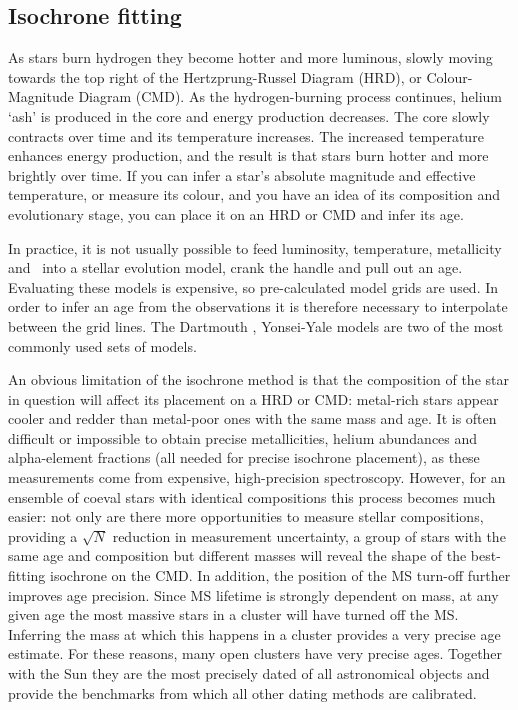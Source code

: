\subsection{Isochrone fitting}

As stars burn hydrogen they become hotter and more luminous, slowly moving
towards the top right of the Hertzprung-Russel Diagram (HRD), or
Colour-Magnitude Diagram (CMD).
As the hydrogen-burning process continues, helium `ash' is produced in the
core and energy production decreases.
The core slowly contracts over time and its temperature increases.
The increased temperature enhances energy production, and the result is that
stars burn hotter and more brightly over time.
If you can infer a star's absolute magnitude and effective temperature, or
measure its colour, and you have an idea of its composition and evolutionary
stage, you can place it on an HRD or CMD and infer its age.

In practice, it is not usually possible to feed luminosity, temperature,
metallicity and \logg\ into a stellar evolution model, crank the handle and
pull out an age.
Evaluating these models is expensive, so pre-calculated model grids are used.
In order to infer an age from the observations it is therefore necessary to
interpolate between the grid lines.
The Dartmouth \citep{dotter}, Yonsei-Yale \citep{spada} models are two of the
most commonly used sets of models.

An obvious limitation of the isochrone method is that the composition of the
star in question will affect its placement on a HRD or CMD: metal-rich stars
appear cooler and redder than metal-poor ones with the same mass and age.
It is often difficult or impossible to obtain precise metallicities, helium
abundances and alpha-element fractions (all needed for precise isochrone
placement), as these measurements come from expensive, high-precision
spectroscopy.
However, for an ensemble of coeval stars with identical compositions this
process becomes much easier: not only are there more opportunities to measure
stellar compositions, providing a $\sqrt N$ reduction in measurement
uncertainty, a group of stars with the same age and composition but different
masses will reveal the shape of the best-fitting isochrone on the CMD\@.
In addition, the position of the MS turn-off further improves age precision.
Since MS lifetime is strongly dependent on mass, at any given age the most
massive stars in a cluster will have turned off the MS.
Inferring the mass at which this happens in a cluster provides a very precise
age estimate.
For these reasons, many open clusters have very precise ages.
Together with the Sun they are the most precisely dated of all astronomical
objects and provide the benchmarks from which all other dating methods are
calibrated.


